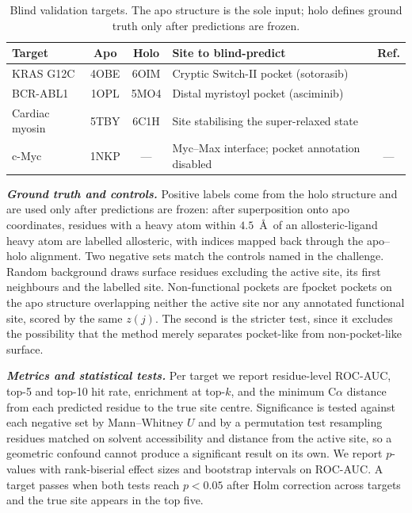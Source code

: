 \documentclass[10pt,a4paper]{article}
\newcommand{\lead}[1]{\textbf{\textit{#1}}}
\begin{document}
\begin{table}[t]
\caption{Blind validation targets. The apo structure is the sole input; holo defines ground truth
only after predictions are frozen.}
\small
\begin{tabularx}{\textwidth}{@{}lcclc@{}}
\toprule
\textbf{Target} & \textbf{Apo} & \textbf{Holo} & \textbf{Site to blind-predict} & \textbf{Ref.}\\
\midrule
KRAS G12C       & 4OBE & 6OIM & Cryptic Switch-II pocket (sotorasib)            & \cite{ostrem2013}\\
BCR-ABL1        & 1OPL & 5MO4 & Distal myristoyl pocket (asciminib)             & \cite{wylie2017}\\
Cardiac myosin  & 5TBY & 6C1H & Site stabilising the super-relaxed state        & \cite{anderson2018}\\
c-Myc           & 1NKP & ---  & Myc--Max interface; pocket annotation disabled  & ---\\
\bottomrule
\end{tabularx}
\end{table}

\lead{Ground truth and controls.} Positive labels come from the holo structure and are used only after predictions are frozen: after
superposition onto apo coordinates, residues with a heavy atom within $4.5$~\AA\ of an
allosteric-ligand heavy atom are labelled allosteric, with indices mapped back through the apo--holo
alignment. Two negative sets match the controls named in the challenge. Random background draws
surface residues excluding the active site, its first neighbours and the labelled site.
Non-functional pockets are fpocket pockets on the apo structure overlapping neither the active site
nor any annotated functional site, scored by the same $z(j)$. The second is the stricter test, since
it excludes the possibility that the method merely separates pocket-like from non-pocket-like
surface.

\lead{Metrics and statistical tests.} Per target we report residue-level ROC-AUC, top-5 and top-10 hit rate, enrichment at top-$k$, and the
minimum C$\alpha$ distance from each predicted residue to the true site centre. Significance is
tested against each negative set by Mann--Whitney $U$ and by a permutation test resampling residues
matched on solvent accessibility and distance from the active site, so a geometric confound cannot
produce a significant result on its own. We report $p$-values with rank-biserial effect sizes and
bootstrap intervals on ROC-AUC. A target passes when both tests reach $p<0.05$ after Holm correction
across targets and the true site appears in the top five.
\end{document}
